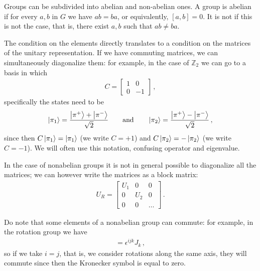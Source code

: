 \documentclass[main.tex]{subfiles}
\begin{document}
Groups can be subdivided into abelian and non-abelian ones.
A group is abelian if for every \(a, b\) in \(G\) we have \(ab = ba\), or equivalently, \([a, b] =0\). 
It is not if this is not the case, that is, there exist \(a, b\) such that \(ab \neq ba\). 

The condition on the elements directly translates to a condition on the matrices of the unitary representation. 
If we have commuting matrices, we can simultaneously diagonalize them: for example, in the case of \(\mathbb{Z}_{2}\) we can go to a basis in which 
%
\begin{subequations}
\begin{align}
C = \left[\begin{array}{cc}
1 & 0 \\ 
0 & -1
\end{array}\right]
\,,
\end{align}
\end{subequations}
%
specifically the states need to be 
%
\begin{align}
\ket{\pi_{1}} = \frac{\ket{\pi^{+}} + \ket{\pi^{-}}}{\sqrt{2}} 
\qquad \text{and} \qquad
\ket{\pi_{2}} = \frac{\ket{\pi^{+}} - \ket{\pi^{-}}}{\sqrt{2}}
\,,
\end{align}
%
since then \(C \ket{\pi_1 } = \ket{\pi_1 }\) (we write \(C = +1\)) and \(C \ket{\pi_{2}} = - \ket{\pi_2 }\) (we write \(C = -1\)). 
We will often use this notation, confusing operator and eigenvalue.

In the case of nonabelian groups it is not in general possible to diagonalize all the matrices; we can however write the matrices as a block matrix: 
%
\begin{subequations}
\begin{align}
U_{R} = \left[\begin{array}{ccc}
U_1  & 0 & 0 \\ 
0 & U_2  & 0 \\ 
0 & 0 & \dots
\end{array}\right] 
\,.
\end{align}
\end{subequations}

Do note that some elements of a nonabelian group can commute: for example, in the rotation group we have 
%
\begin{align}
[J^{i}, J^{j}] = \epsilon^{ijk} J_{k}
\,,
\end{align}
%
so if we take \(i = j\), that is, we consider rotations along the same axis, they will commute since then the Kronecker symbol is equal to zero. 
\end{document}
